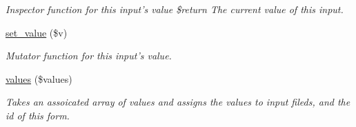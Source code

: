 \begin{DoxyCompactItemize}
\begin{DoxyCompactList}\small\item\em Inspector function for this input's value \$return The current value of this input. \end{DoxyCompactList}\item 
\hyperlink{classinput_a2383e00d55bf3dbcc7071b2fe1336aec}{set\-\_\-value} (\$v)
\begin{DoxyCompactList}\small\item\em Mutator function for this input's value. \end{DoxyCompactList}\item 
\hyperlink{classinput_a78f0cd122c69a6f62875152c0cfc9bc2}{values} (\$values)
\begin{DoxyCompactList}\small\item\em Takes an assoicated array of values and assigns the values to input fileds, and the id of this form. \end{DoxyCompactList}\end{DoxyCompactItemize}
